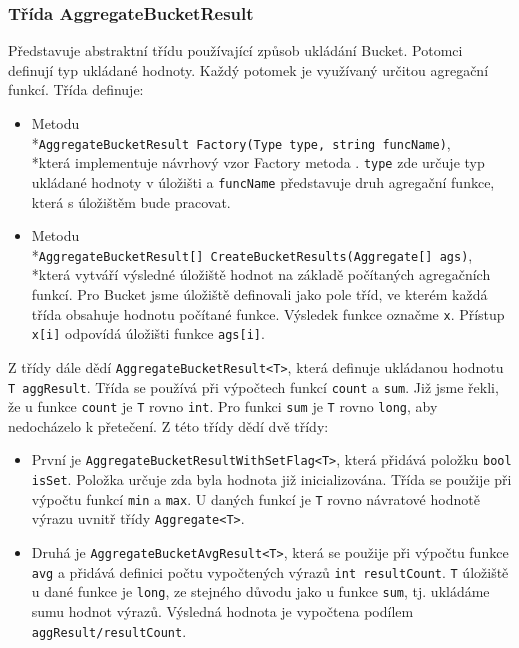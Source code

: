 \subsubsection{Třída AggregateBucketResult}

Představuje abstraktní třídu používající způsob ukládání Bucket.
Potomci definují typ ukládané hodnoty.
Každý potomek je využívaný určitou agregační funkcí.
Třída definuje:
\begin{itemize}
\item Metodu \\*\texttt{AggregateBucketResult Factory(Type type, string funcName)}, \\*která implementuje návrhový vzor Factory metoda \citep[str. 107]{patterns}.
\texttt{type} zde určuje typ ukládané hodnoty v úložišti a \texttt{funcName} představuje druh agregační funkce, která s úložištěm bude pracovat.
\item Metodu \\*\texttt{AggregateBucketResult[] CreateBucketResults(Aggregate[] ags)}, \\*která vytváří výsledné úložiště hodnot na základě počítaných agregačních funkcí.
Pro Bucket jsme úložiště definovali jako pole tříd, ve kterém každá třída obsahuje hodnotu počítané funkce.
Výsledek funkce označme \texttt{x}. 
Přístup \texttt{x[i]} odpovídá úložišti funkce \texttt{ags[i]}.
\end{itemize}
Z třídy dále dědí \texttt{AggregateBucketResult<T>}, která definuje ukládanou hodnotu \texttt{T aggResult}.
Třída se používá při výpočtech funkcí \texttt{count} a \texttt{sum}.
Již jsme řekli, že u funkce \texttt{count} je \texttt{T} rovno \texttt{int}.
Pro funkci \texttt{sum} je \texttt{T} rovno \texttt{long}, aby nedocházelo k přetečení.
Z této třídy dědí dvě třídy:
\begin{itemize}
\item První je \texttt{AggregateBucketResultWithSetFlag<T>}, která přidává položku \texttt{bool isSet}.
Položka určuje zda byla hodnota již inicializována.
Třída se použije při výpočtu funkcí \texttt{min} a \texttt{max}.
U daných funkcí je \texttt{T} rovno návratové hodnotě výrazu uvnitř třídy \texttt{Aggregate<T>}.

\item Druhá je \texttt{AggregateBucketAvgResult<T>}, která se použije při výpočtu funkce \texttt{avg} a přidává definici počtu vypočtených výrazů \texttt{int resultCount}.
\texttt{T} úložiště u dané funkce je \texttt{long}, ze stejného důvodu jako u funkce \texttt{sum}, tj. ukládáme sumu hodnot výrazů. 
Výsledná hodnota je vypočtena podílem \texttt{aggResult/resultCount}.
\end{itemize}

